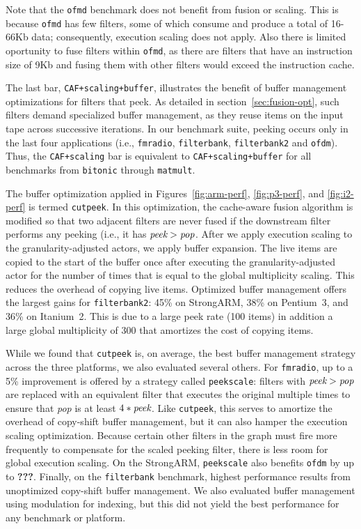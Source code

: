 Note that the \texttt{ofmd} benchmark does not benefit from fusion or
scaling. This is because \texttt{ofmd} has few filters, some of which
consume and produce a total of 16-66Kb data; consequently, execution
scaling does not apply.  Also there is limited oportunity to fuse
filters within \texttt{ofmd}, as there are filters that have an
instruction size of 9Kb and fusing them with other filters would
exceed the instruction cache.

The last bar, {\tt CAF+scaling+buffer}, illustrates the benefit of
buffer management optimizations for filters that peek.  As detailed in
section~\ref{sec:fusion-opt}, such filters demand specialized buffer
management, as they reuse items on the input tape across successive
iterations.  In our benchmark suite, peeking occurs only in the last
four applications (i.e., \texttt{fmradio}, \texttt{filterbank},
\texttt{filterbank2} and \texttt{ofdm}).  Thus, the {\tt CAF+scaling}
bar is equivalent to {\tt CAF+scaling+buffer} for all benchmarks from
{\tt bitonic} through {\tt matmult}.

The buffer optimization applied in Figures~\ref{fig:arm-perf},
\ref{fig:p3-perf}, and \ref{fig:i2-perf} is termed {\tt cutpeek}.  In
this optimization, the cache-aware fusion algorithm is modified so
that two adjacent filters are never fused if the downstream filter
performs any peeking (i.e., it has $\mbox{\it peek} > \mbox{\it pop}$.
After we apply execution scaling to the granularity-adjusted actors,
we apply buffer expansion.  The live items are copied to the start of
the buffer once after executing the granularity-adjusted actor for the
number of times that is equal to the global multiplicity scaling. This
reduces the overhead of copying live items.  Optimized buffer
management offers the largest gains for {\tt filterbank2}: 45\%
on StrongARM, 38\% on Pentium~3, and 36\% on Itanium~2.
This is due to a large peek rate (100 items) in addition a large
global multiplicity of 300 that amortizes the cost of copying
items.

While we found that {\tt cutpeek} is, on average, the best buffer
management strategy across the three platforms, we also evaluated
several others.  For {\tt fmradio}, up to a 5\% improvement is offered
by a strategy called {\tt peekscale}: filters with $\mbox{\it
peek}>\mbox{\it pop}$ are replaced with an equivalent filter that
executes the original multiple times to ensure that {\it pop} is at
least $4*\mbox{\it peek}$.  Like {\tt cutpeek}, this serves to
amortize the overhead of copy-shift buffer management, but it can also
hamper the execution scaling optimization.  Because certain other
filters in the graph must fire more frequently to compensate for the
scaled peeking filter, there is less room for global execution
scaling.  On the StrongARM, {\tt peekscale} also benefits {\tt ofdm}
by up to {\bf ???}.  Finally, on the {\tt filterbank} benchmark,
highest performance results from unoptimized copy-shift buffer
management.  We also evaluated buffer management using modulation for
indexing, but this did not yield the best performance for any
benchmark or platform.

